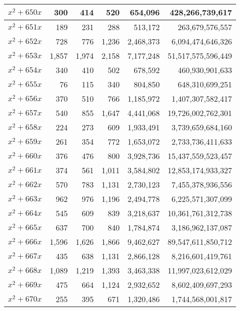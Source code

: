 \documentclass[a4paper]{amsproc}
\theoremstyle{plain}
\begin{document}
\begin{longtable}{ | l | r | r | r | r | r | }
$x^2 + 650x$ & 300 & 414 & 520 & 654{,}096 & 428{,}266{,}739{,}617 \\ \hline
$x^2 + 651x$ & 189 & 231 & 288 & 513{,}172 & 263{,}679{,}576{,}557 \\ \hline
$x^2 + 652x$ & 728 & 776 & 1{,}236 & 2{,}468{,}373 & 6{,}094{,}474{,}646{,}326 \\ \hline
$x^2 + 653x$ & 1{,}857 & 1{,}974 & 2{,}158 & 7{,}177{,}248 & 51{,}517{,}575{,}596{,}449 \\ \hline
$x^2 + 654x$ & 340 & 410 & 502 & 678{,}592 & 460{,}930{,}901{,}633 \\ \hline
$x^2 + 655x$ & 76 & 115 & 340 & 804{,}850 & 648{,}310{,}699{,}251 \\ \hline
$x^2 + 656x$ & 370 & 510 & 766 & 1{,}185{,}972 & 1{,}407{,}307{,}582{,}417 \\ \hline
$x^2 + 657x$ & 540 & 855 & 1{,}647 & 4{,}441{,}068 & 19{,}726{,}002{,}762{,}301 \\ \hline
$x^2 + 658x$ & 224 & 273 & 609 & 1{,}933{,}491 & 3{,}739{,}659{,}684{,}160 \\ \hline
$x^2 + 659x$ & 261 & 354 & 772 & 1{,}653{,}072 & 2{,}733{,}736{,}411{,}633 \\ \hline
$x^2 + 660x$ & 376 & 476 & 800 & 3{,}928{,}736 & 15{,}437{,}559{,}523{,}457 \\ \hline
$x^2 + 661x$ & 374 & 561 & 1{,}011 & 3{,}584{,}802 & 12{,}853{,}174{,}933{,}327 \\ \hline
$x^2 + 662x$ & 570 & 783 & 1{,}131 & 2{,}730{,}123 & 7{,}455{,}378{,}936{,}556 \\ \hline
$x^2 + 663x$ & 962 & 976 & 1{,}196 & 2{,}494{,}778 & 6{,}225{,}571{,}307{,}099 \\ \hline
$x^2 + 664x$ & 545 & 609 & 839 & 3{,}218{,}637 & 10{,}361{,}761{,}312{,}738 \\ \hline
$x^2 + 665x$ & 637 & 700 & 840 & 1{,}784{,}874 & 3{,}186{,}962{,}137{,}087 \\ \hline
$x^2 + 666x$ & 1{,}596 & 1{,}626 & 1{,}866 & 9{,}462{,}627 & 89{,}547{,}611{,}850{,}712 \\ \hline
$x^2 + 667x$ & 435 & 638 & 1{,}131 & 2{,}866{,}128 & 8{,}216{,}601{,}419{,}761 \\ \hline
$x^2 + 668x$ & 1{,}089 & 1{,}219 & 1{,}393 & 3{,}463{,}338 & 11{,}997{,}023{,}612{,}029 \\ \hline
$x^2 + 669x$ & 475 & 664 & 1{,}124 & 2{,}932{,}652 & 8{,}602{,}409{,}697{,}293 \\ \hline
$x^2 + 670x$ & 255 & 395 & 671 & 1{,}320{,}486 & 1{,}744{,}568{,}001{,}817 \\ \hline

\end{longtable}
\end{document}
